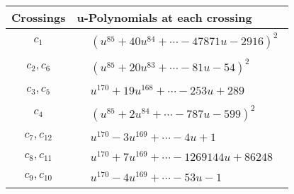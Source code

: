 \documentclass[1p]{elsarticle_modified}
\theoremstyle{definition}
\begin{document}
\begin{tabular}{m{50pt}|m{274pt}}
Crossings & \hspace{64pt}u-Polynomials at each crossing \\
\hline $$\begin{aligned}c_{1}\end{aligned}$$&$\begin{aligned}
&(u^{85}+40 u^{84}+\cdots-47871 u-2916)^{2}
\end{aligned}$\\
\hline $$\begin{aligned}c_{2},c_{6}\end{aligned}$$&$\begin{aligned}
&(u^{85}+20 u^{83}+\cdots-81 u-54)^{2}
\end{aligned}$\\
\hline $$\begin{aligned}c_{3},c_{5}\end{aligned}$$&$\begin{aligned}
&u^{170}+19 u^{168}+\cdots-253 u+289
\end{aligned}$\\
\hline $$\begin{aligned}c_{4}\end{aligned}$$&$\begin{aligned}
&(u^{85}+2 u^{84}+\cdots-787 u-599)^{2}
\end{aligned}$\\
\hline $$\begin{aligned}c_{7},c_{12}\end{aligned}$$&$\begin{aligned}
&u^{170}-3 u^{169}+\cdots-4 u+1
\end{aligned}$\\
\hline $$\begin{aligned}c_{8},c_{11}\end{aligned}$$&$\begin{aligned}
&u^{170}+7 u^{169}+\cdots-1269144 u+86248
\end{aligned}$\\
\hline $$\begin{aligned}c_{9},c_{10}\end{aligned}$$&$\begin{aligned}
&u^{170}-4 u^{169}+\cdots-53 u-1
\end{aligned}$\\
\hline
\end{tabular}\\~\\
\end{document}

